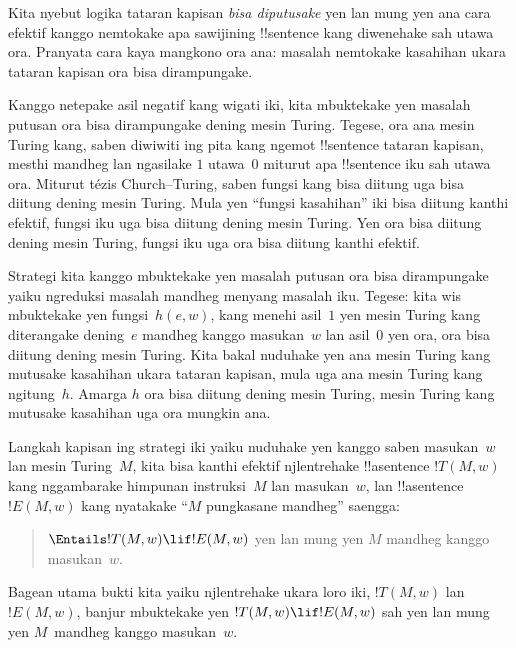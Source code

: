 \documentclass[../../../include/open-logic-section]{subfiles}
\begin{document}

Kita nyebut logika tataran kapisan \emph{bisa diputusake}
yen lan mung yen ana cara efektif kanggo nemtokake
apa sawijining !!{sentence} kang diwenehake sah
utawa ora. Pranyata cara kaya mangkono ora ana:
masalah nemtokake kasahihan ukara tataran kapisan
ora bisa dirampungake.

Kanggo netepake asil negatif kang wigati iki,
kita mbuktekake yen masalah putusan ora bisa
dirampungake dening mesin Turing. Tegese,
ora ana mesin Turing kang, saben diwiwiti
ing pita kang ngemot !!{sentence} tataran kapisan,
mesthi mandheg lan ngasilake $1$ utawa~$0$
miturut apa !!{sentence} iku sah utawa ora.
Miturut tézis Church--Turing, saben fungsi
kang bisa diitung uga bisa diitung dening
mesin Turing. Mula yen ``fungsi kasahihan''
iki bisa diitung kanthi efektif, fungsi iku
uga bisa diitung dening mesin Turing.
Yen ora bisa diitung dening mesin Turing,
fungsi iku uga ora bisa diitung kanthi efektif.

Strategi kita kanggo mbuktekake yen masalah
putusan ora bisa dirampungake yaiku ngreduksi
masalah mandheg menyang masalah iku. Tegese:
kita wis mbuktekake yen fungsi~$h(e,w)$,
kang menehi asil~$1$ yen mesin Turing
kang diterangake dening~$e$ mandheg kanggo
masukan~$w$ lan asil~$0$ yen ora, ora
bisa diitung dening mesin Turing. Kita
bakal nuduhake yen ana mesin Turing kang
mutusake kasahihan ukara tataran kapisan,
mula uga ana mesin Turing kang ngitung~$h$.
Amarga $h$ ora bisa diitung dening mesin
Turing, mesin Turing kang mutusake kasahihan
uga ora mungkin ana.

Langkah kapisan ing strategi iki yaiku nuduhake
yen kanggo saben masukan~$w$ lan mesin Turing~$M$,
kita bisa kanthi efektif njlentrehake
!!a{sentence} $!T(M, w)$ kang nggambarake
himpunan instruksi~$M$ lan masukan~$w$,
lan !!a{sentence}~$!E(M, w)$ kang nyatakake
``$M$ pungkasane mandheg'' saengga:
\begin{quote}
  $\Entails !T(M, w) \lif !E(M,w)$ yen lan mung yen $M$ mandheg kanggo masukan~$w$.
\end{quote}
Bagean utama bukti kita yaiku njlentrehake
ukara loro iki, $!T(M, w)$ lan~$!E(M, w)$,
banjur mbuktekake yen $!T(M, w) \lif !E(M, w)$
sah yen lan mung yen $M$~mandheg kanggo masukan~$w$.
\end{document}
